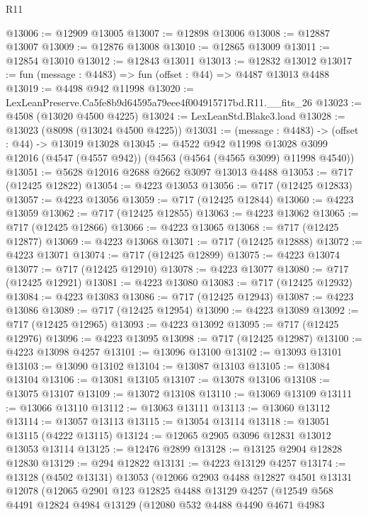 \begin{lexlean}{R11}
\begin{coremodule}
@13006 := @12909 @13005
@13007 := @12898 @13006
@13008 := @12887 @13007
@13009 := @12876 @13008
@13010 := @12865 @13009
@13011 := @12854 @13010
@13012 := @12843 @13011
@13013 := @12832 @13012
@13017 := fun (message : @4483) => fun (offset : @44) => @4487 @13013 @4488
@13019 := @4498 @942 @11998
@13020 := LexLeanPreserve.Ca5fe8b9d64595a79eee4f004915717bd.R11.__fits_26
@13023 := @4508 (@13020 @4500 @4225)
@13024 := LexLeanStd.Blake3.load
@13028 := @13023 (@8098 (@13024 @4500 @4225))
@13031 := (message : @4483) -> (offset : @44) -> @13019 @13028
@13045 := @4522
    @942
    @11998
    @13028
    @3099
    @12016
    (@4547 (@4557 @942))
    (@4563 (@4564 (@4565 @3099) @11998 @4540))
@13051 := @5628 @12016 @2688 @2662 @3097 @13013 @4488
@13053 := @717 (@12425 @12822)
@13054 := @4223 @13053
@13056 := @717 (@12425 @12833)
@13057 := @4223 @13056
@13059 := @717 (@12425 @12844)
@13060 := @4223 @13059
@13062 := @717 (@12425 @12855)
@13063 := @4223 @13062
@13065 := @717 (@12425 @12866)
@13066 := @4223 @13065
@13068 := @717 (@12425 @12877)
@13069 := @4223 @13068
@13071 := @717 (@12425 @12888)
@13072 := @4223 @13071
@13074 := @717 (@12425 @12899)
@13075 := @4223 @13074
@13077 := @717 (@12425 @12910)
@13078 := @4223 @13077
@13080 := @717 (@12425 @12921)
@13081 := @4223 @13080
@13083 := @717 (@12425 @12932)
@13084 := @4223 @13083
@13086 := @717 (@12425 @12943)
@13087 := @4223 @13086
@13089 := @717 (@12425 @12954)
@13090 := @4223 @13089
@13092 := @717 (@12425 @12965)
@13093 := @4223 @13092
@13095 := @717 (@12425 @12976)
@13096 := @4223 @13095
@13098 := @717 (@12425 @12987)
@13100 := @4223 @13098 @4257
@13101 := @13096 @13100
@13102 := @13093 @13101
@13103 := @13090 @13102
@13104 := @13087 @13103
@13105 := @13084 @13104
@13106 := @13081 @13105
@13107 := @13078 @13106
@13108 := @13075 @13107
@13109 := @13072 @13108
@13110 := @13069 @13109
@13111 := @13066 @13110
@13112 := @13063 @13111
@13113 := @13060 @13112
@13114 := @13057 @13113
@13115 := @13054 @13114
@13118 := @13051 @13115 (@4222 @13115)
@13124 := @12065 @2905 @3096 @12831 @13012 @13053 @13114
@13125 := @12476 @2899
@13128 := @13125 @2904 @12828 @12830
@13129 := @294 @12822
@13131 := @4223 @13129 @4257
@13174 := @13128
    (@4502 @13131)
    @13053
    (@12066
      @2903
      @4488
      @12827
      @4501
      @13131
      @12078
      (@12065
        @2901
        @123
        @12825
        @4488
        @13129
        @4257
        (@12549
          @568
          @4491
          @12824
          @4984
          @13129
          (@12080
            @532
            @4488
            @4490
            @4671
            @4983

\end{coremodule}
\end{lexlean}
